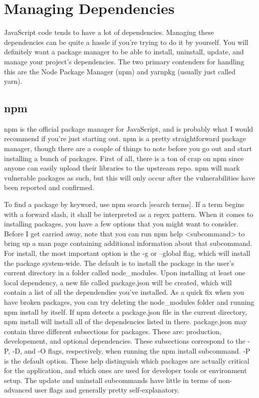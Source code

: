 \documentclass{article}
\begin{document}
\section{Managing Dependencies}

JavaScript code tends to have a lot of dependencies. Managing these dependencies can be quite a hassle if 
you're trying to do it by yourself. You will definitely want a package manager to be able to install, uninstall,
update, and manage your project's dependencies. The two primary contenders for handling this are the Node 
Package Manager (npm) and yarnpkg (usually just called yarn).

\subsection{npm}

npm is the official package manager for JavaScript, and is probably what I would recommend if you're just 
starting out. npm is a pretty straightforward package manager, though there are a couple of things to note 
before you go out and start installing a bunch of packages. First of all, there is a ton of crap on npm since 
anyone can easily upload their libraries to the upstream repo. npm will mark vulnerable packages as such, but 
this will only occur after the vulnerabilities have been reported and confirmed. 

To find a package by keyword, use npm search [search terms]. If a term begins with a forward slash, it shall be 
interpreted as a regex pattern. When it comes to installing packages, you have a few options that you might 
want to consider. Before I get carried away, note that you can run npm help <subcommand> to bring up a man 
page containing additional information about that subcommand. For install, the most important option is the 
-g or --global flag, which will install the package system-wide. The default is to install the package in the 
user's current directory in a folder called node_modules. Upon installing at least one local dependency, a new 
file called package.json will be created, which will contain a list of all the dependendies you've installed. 
As a quick fix when you have broken packages, you can try deleting the node_modules folder and running 
npm install by itself. If npm detects a package.json file in the current directory, npm install will install 
all of the dependencies listed in there. package.json may contain three different subsections for packages. 
These are: production, developement, and optional dependencies. These subsections correspond to the -P, -D, 
and -O flags, respectively, when running the npm install subcommand. -P is the default option. These help 
distinguish which packages are actually critical for the application, and which ones are used for developer 
tools or environment setup. The update and uninstall subcommands have little in terms of non-advanced user 
flags and generally pretty self-explanatory.
\end{document}
